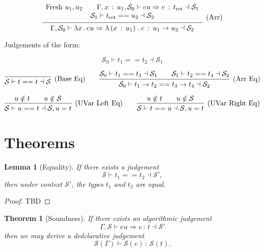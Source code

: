 \documentclass{article}
\newtheorem{theorem}{Theorem}
\newtheorem{lemma}{Lemma}
\newcommand{\G}{\Gamma}
\newcommand{\St}{\mathcal{S}}
\newcommand{\tp}{t}
\newcommand{\tret}{t_{\text{ret}}}
\newcommand{\uv}{u}
\newcommand{\eu}{eu}
\newcommand{\e}{e}
\newcommand{\x}{x}
\newcommand{\spc}{\qquad}
\newcommand{\eq}{==}
\renewcommand{\implies}{\Rightarrow}
\newcommand{\fresh}{\text{Fresh}\ }
\newcommand{\withtp}[2]{{#1} \,:\, {#2}}
\newcommand{\lam}[2]{\lambda {#1} \,.\, {#2}}
\newcommand{\lamtp}[3]{\lambda \left( {\withtp {#1} {#2}} \right) \,.\, {#3}}
\newcommand{\arr}[2]{{#1} \to {#2}}
\newcommand{\hastp}[3]{#1 \vdash {\withtp {#2} {#3}}}
\newcommand{\algtp}[6]{#1, #2 \vdash #3 \implies {\withtp {#4} {#5}} \dashv #6}
\newcommand{\equals}[4]{{#1} \vdash {#2} \eq {#3} \dashv {#4}}
\newcommand{\deduct}[3][]
{
  \begin{prooftree}
    \hypo{#2}
    \infer1[\text{#1}]{#3}
  \end{prooftree}
}
\begin{document}
\[
  \deduct
  {
    \begin{array}{c}
      \fresh \uv_1, \uv_2 \spc
      \algtp {\G, \withtp \x {\uv_1}} {\St_0} \eu \e \tret {\St_1} \\
      \equals {\St_1} \tret {\uv_2} {\St_2}
    \end{array}
  }
  {\algtp \G {\St_0} {\lam \x \eu} {\lamtp \x {\uv_1} \e} {\arr {\uv_1} {\uv_2}} {\St_2}}
  {\text{(Arr)}}
\]

Judgements of the form:

\[ \equals {\St_0} {\tp_1} {\tp_2} {\St_1} \]

\[
  \deduct
  {}
  {\equals \St \tp \tp \St}
  {\text{(Base Eq)}}
  \spc
  \deduct
  {\equals {\St_0} {\tp_1} {\tp_3} {\St_1} \spc
   \equals {\St_1} {\tp_2} {\tp_4} {\St_2}}
  {\equals {\St_0} {\arr {\tp_1} {\tp_2}} {\arr {\tp_3} {\tp_4}} {\St_2}}
  {\text{(Arr Eq)}}
\]

\[
  \deduct
  {\uv \notin \tp \spc \uv \notin \St}
  {\equals \St \uv \tp {\St, \uv = \tp}}
  {\text{(UVar Left Eq)}}
  \spc
  \deduct
  {\uv \notin \tp \spc \uv \notin \St}
  {\equals \St \tp \uv {\St, \uv = \tp}}
  {\text{(UVar Right Eq)}}
\]

\section{Theorems}

\begin{lemma}[Equality]
  If there exists a judgement
  \[ \equals \St {\tp_1} {\tp_2} {\St'},\]
  then under context \(\St'\), the types \(\tp_1\) and \(\tp_2\) are equal.
\end{lemma}

\begin{proof}
  TBD
\end{proof}

\begin{theorem}[Soundness]
  If there exists an algorithmic judgement
\[ \algtp \G \St \eu \e \tp \St' \]
  then we may derive a dedclarative judgement
\[ \hastp {\St(\G)} {\St(\e)} {\St(t)}.\]
\end{theorem}
\end{document}
